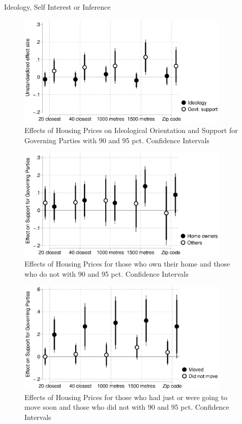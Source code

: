 \documentclass[12pt,a4paper]{article}
\begin{document}
Ideology, Self Interest or Inference



\begin{figure}[htbp!]
	\includegraphics[width=0.9\textwidth]{../figures/ideology.eps}
	\centering
	\caption{Effects of Housing Prices on Ideological Orientation and Support for Governing Parties with 90  and 95 pct. Confidence Intervals}\label{ideology}
\end{figure}

\begin{figure}[htbp!]
	\includegraphics[width=0.9\textwidth]{../figures/homeown.eps}
	\centering
	\caption{Effects of Housing Prices for those who own their home and those who do not with 90  and 95 pct. Confidence Intervals}\label{homeown}
\end{figure}

\begin{figure}[htbp!]
	\includegraphics[width=0.9\textwidth]{../figures/moving.eps}
	\centering
	\caption{Effects of Housing Prices for those who had just or were going to move soon and those who did not with 90 and 95 pct. Confidence Intervals}\label{move}
\end{figure}
\end{document}
